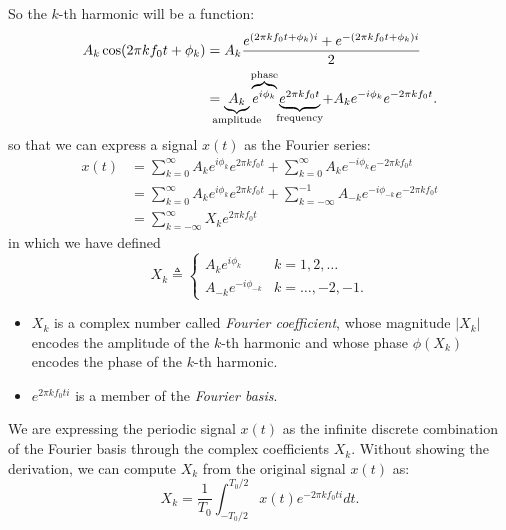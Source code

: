 So the $k$-th harmonic will be a function:
\begin{equation}
    \begin{aligned}
        A_k \cos(2 \pi k f_0 t + \phi_k) & = A_k \frac{e^{(2 \pi k f_0 t + \phi_k) i} + e^{-(2 \pi k f_0 t + \phi_k) i}}{2}  \\
        & = \underbrace{A_k}_{\mathclap{\text{amplitude}}} \overbrace{e^{i \phi_k}}^{\mathclap{\text{phase}}} \underbrace{e^{2 \pi k f_0 t}}_{\mathclap{\text{frequency}}} + A_k e^{- i \phi_{k}} e^{-2 \pi k f_0 t}.
    \end{aligned}
\end{equation}
so that we can express a signal $x(t)$ as the Fourier series:
\begin{equation}
    \begin{aligned}
        x(t) & = \sum_{k = 0}^{\infty} A_k e^{i \phi_{k}} e^{2 \pi k f_0 t} + \sum_{k = 0}^{\infty} A_k e^{-i \phi_{k}} e^{-2 \pi k f_0 t} \\
        & = \sum_{k = 0}^{\infty} A_k e^{i \phi_{k}} e^{2 \pi k f_0 t} + \sum_{k = -\infty}^{-1} A_{-k} e^{-i \phi_{-k}} e^{-2 \pi k f_0 t} \\
        & = \sum_{k = - \infty}^{\infty} X_k e^{2 \pi k f_0 t}
    \end{aligned}
\end{equation}
in which we have defined 
\begin{equation}
    X_k \triangleq 
    \begin{cases}
        A_k e^{i \phi_k} & k = 1, 2, \dots \\
        A_{-k} e^{-i \phi_{-k}} & k = \dots, -2, -1.
    \end{cases}
\end{equation}
\begin{itemize}
    \item  $X_k$ is a complex number called \emph{Fourier coefficient}, whose magnitude $|X_k|$ encodes the amplitude of the $k$-th harmonic and whose phase $\phi(X_k)$ encodes the phase of the $k$-th harmonic.
    \item $e^{2 \pi k f_0 t i}$ is a member of the \emph{Fourier basis}.
\end{itemize}

We are expressing the periodic signal $x(t)$ as the infinite discrete combination of the Fourier basis through the complex coefficients $X_k$. 
Without showing the derivation, we can compute $X_k$ from the original signal $x(t)$ as:
\begin{equation}
    X_k = \frac{1}{T_0} \int_{-T_0/2}^{T_0 / 2} x(t) e^{- 2\pi k f_0 t i} dt.
\end{equation}

